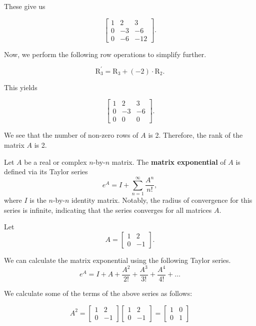 \begin{definition}
\begin{example}
These give us

\[ \begin{bmatrix} 1 & 2 & 3 \\ 0 & -3 & -6 \\ 0 & -6 & -12 \end{bmatrix}. \]

Now, we perform the following row operations to simplify further.

\[ \text{R}_3^{'} = \text{R}_3 + (-2) \cdot \text{R}_2. \]

This yields

\[ \begin{bmatrix} 1 & 2 & 3 \\ 0 & -3 & -6 \\ 0 & 0 & 0 \end{bmatrix}. \]

We see that the number of non-zero rows of $A$ is 2. Therefore, the rank of the matrix \( A \) is 2.
\end{example}




\begin{definition}
    Let $A$ be a real or complex $n$-by-$n$ matrix. The \textbf{matrix exponential} of $A$ is defined via its Taylor series
\[ e^A = I + \sum_{n=1}^{\infty} \frac{A^n}{n!}, \]
where $I$ is the $n$-by-$n$ identity matrix. Notably, the radius of convergence for this series is infinite, indicating that the series converges for all matrices $A$. 


\end{definition}
\begin{example}
Let
\[ A = \begin{bmatrix} 1 & 2 \\ 0 & -1 \end{bmatrix}. \]

We can calculate the matrix exponential using the following Taylor series. 
\[ e^A = I + A + \frac{A^2}{2!} + \frac{A^3}{3!} + \frac{A^4}{4!} + \ldots \]

We calculate some of the terms of the above series as follows:

\[ A^2 = \begin{bmatrix} 1 & 2 \\ 0 & -1 \end{bmatrix} \begin{bmatrix} 1 & 2 \\ 0 & -1 \end{bmatrix} = \begin{bmatrix} 1 & 0 \\ 0 & 1 \end{bmatrix} \]


\end{example}
\end{definition}
